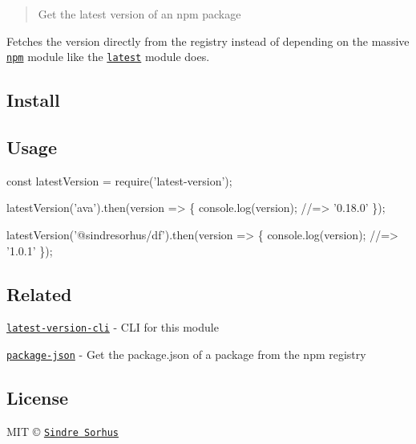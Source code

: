 \begin{quote}
Get the latest version of an npm package \end{quote}


Fetches the version directly from the registry instead of depending on the massive \href{https://github.com/npm/npm/blob/8b5e7b6ae5b4cd2d7d62eaf93b1428638b387072/package.json#L37-L85}{\tt npm} module like the \href{https://github.com/bahamas10/node-latest}{\tt latest} module does.

\subsection*{Install}




\subsection*{Usage}


\begin{DoxyCode}
const latestVersion = require('latest-version');

latestVersion('ava').then(version => \{
  console.log(version);
  //=> '0.18.0'
\});

latestVersion('@sindresorhus/df').then(version => \{
  console.log(version);
  //=> '1.0.1'
\});
\end{DoxyCode}


\subsection*{Related}


\begin{DoxyItemize}
\item \href{https://github.com/sindresorhus/latest-version-cli}{\tt latest-\/version-\/cli} -\/ C\+LI for this module
\item \href{https://github.com/sindresorhus/package-json}{\tt package-\/json} -\/ Get the package.\+json of a package from the npm registry
\end{DoxyItemize}

\subsection*{License}

M\+IT © \href{https://sindresorhus.com}{\tt Sindre Sorhus} 